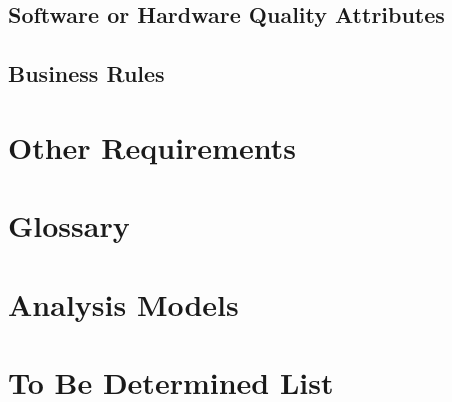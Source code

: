 \documentclass[english]{article}
\numberwithin{equation}{section} %
\begin{document}
\subsection{Software or Hardware Quality Attributes}
\subsection{Business Rules}

\newpage
\section{Other Requirements}
\appendix
\section{Glossary}
\section{Analysis Models}
\section{To Be Determined List}
\end{document}
